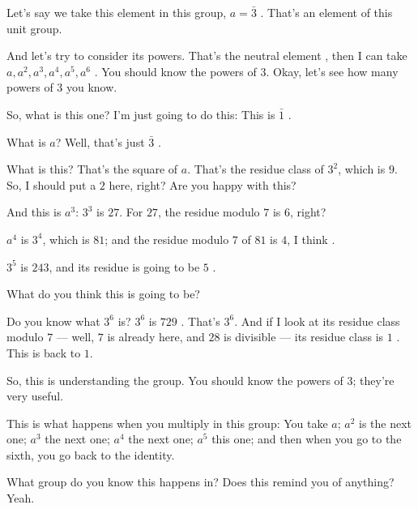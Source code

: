 \begin{speech}[00:37:28 - 00:38:51]
Let's say we take this element in this group, $a = \bar{3}$ . That's an element of this unit group.

And let's try to consider its powers. That's the neutral element , then I can take $a, a^2, a^3, a^4, a^5, a^6$ . You should know the powers of $3$. Okay, let's see how many powers of $3$ you know.

So, what is this one? I'm just going to do this: This is $\bar{1}$ .

What is $a$? Well, that's just $\bar{3}$ .

What is this? That's the square of $a$. That's the residue class of $3^2$, which is $9$. So, I should put a $2$ here, right?  Are you happy with this?

And this is $a^3$: $3^3$ is $27$. For $27$, the residue modulo $7$ is $6$, right? 

$a^4$ is $3^4$, which is $81$; and the residue modulo $7$ of $81$ is $4$, I think .

$3^5$ is $243$, and its residue is going to be $5$ .
\end{speech}

\begin{speech}[00:38:51 - 00:39:45]
What do you think this is going to be? 

Do you know what $3^6$ is? $3^6$ is $729$ . That's $3^6$. And if I look at its residue class modulo $7$ --- well, $7$ is already here, and $28$ is divisible --- its residue class is $1$ . This is back to $1$.

So, this is understanding the group. You should know the powers of $3$; they're very useful.

This is what happens when you multiply in this group: You take $a$; $a^2$ is the next one; $a^3$ the next one; $a^4$ the next one; $a^5$ this one; and then when you go to the sixth, you go back to the identity.

What group do you know this happens in? Does this remind you of anything? Yeah.
\end{speech}

